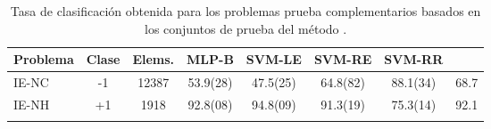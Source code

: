\begin{table}[h]
  \tableStyle
  \begin{tabular}{lS[table-format=2.0]
      S[table-format=4.0]SSSSS[table-format=2.1]}
    \toprule
    {Problema} & {Clase} & {Elems.} &
    {MLP-B}    & {SVM-LE}   & {SVM-RE}   & {SVM-RR} & \cite{ng} \\
    \midrule
    IE-NC & -1 & 12387 & 53.9(28) & 47.5(25) & 64.8(82) & 88.1(34) & 68.7 \\
    IE-NH & +1 &  1918 & 92.8(08) & 94.8(09) & 91.3(19) & 75.3(14) & 92.1 \\
    \bottomrule
    \\
  \end{tabular}
  \caption{\captionStyle Tasa de clasificación obtenida para los
    problemas prueba complementarios basados en los conjuntos de
    prueba del método .}
  \label{tbl:suppl-ng}

\end{table}